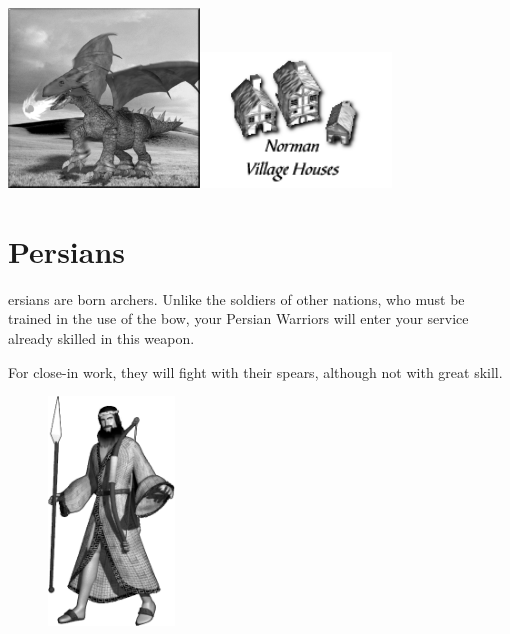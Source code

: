 \begin{center}
	\includegraphics[width=2in]{Adragon}\hspace{1pt}\includegraphics[width=2in]{Inormanhouse}
\end{center}

\clearpage

\section{Persians}


ersians are born archers. Unlike the soldiers of other nations, who must be trained in the use of the bow, your Persian Warriors will enter your service already skilled in this weapon.

For close-in work, they will fight with their spears, although not with great skill.

\begin{figure}
	\begin{center}
		\vspace{-20pt}
		\includegraphics[width=0.3\textwidth]{Apersian}
	\end{center}
	\vspace{-40pt}
\end{figure}

